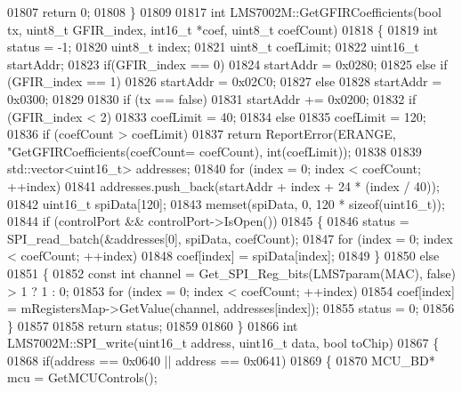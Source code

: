 \begin{DoxyCode}
{{{{{{{{{{{{{{{{{{{{{{{{{{{{{{{{{{{{{{{{{{{{{{{{{{{{{{01807     \textcolor{keywordflow}{return} 0;
01808 \}
01809 
01817 \textcolor{keywordtype}{int} LMS7002M::GetGFIRCoefficients(\textcolor{keywordtype}{bool} tx, uint8\_t GFIR\_index, int16\_t *coef, uint8\_t coefCount)
01818 \{
01819     \textcolor{keywordtype}{int} status = -1;
01820     uint8\_t index;
01821     uint8\_t coefLimit;
01822     uint16\_t startAddr;
01823     \textcolor{keywordflow}{if}(GFIR\_index == 0)
01824         startAddr = 0x0280;
01825     \textcolor{keywordflow}{else} \textcolor{keywordflow}{if} (GFIR\_index == 1)
01826         startAddr = 0x02C0;
01827     \textcolor{keywordflow}{else}
01828         startAddr = 0x0300;
01829 
01830     \textcolor{keywordflow}{if} (tx == \textcolor{keyword}{false})
01831         startAddr += 0x0200;
01832     \textcolor{keywordflow}{if} (GFIR\_index < 2)
01833         coefLimit = 40;
01834     \textcolor{keywordflow}{else}
01835         coefLimit = 120;
01836     \textcolor{keywordflow}{if} (coefCount > coefLimit)
01837         \textcolor{keywordflow}{return} ReportError(ERANGE, \textcolor{stringliteral}{"GetGFIRCoefficients(coefCount=%
      coefCount), \textcolor{keywordtype}{int}(coefLimit));
01838 
01839     std::vector<uint16\_t> addresses;
01840     \textcolor{keywordflow}{for} (index = 0; index < coefCount; ++index)
01841         addresses.push\_back(startAddr + index + 24 * (index / 40));
01842     uint16\_t spiData[120];
01843     memset(spiData, 0, 120 * \textcolor{keyword}{sizeof}(uint16\_t));
01844     \textcolor{keywordflow}{if} (controlPort && controlPort->IsOpen())
01845     \{
01846         status = SPI_read_batch(&addresses[0], spiData, coefCount);
01847         \textcolor{keywordflow}{for} (index = 0; index < coefCount; ++index)
01848             coef[index] = spiData[index];
01849     \}
01850     \textcolor{keywordflow}{else}
01851     \{
01852         \textcolor{keyword}{const} \textcolor{keywordtype}{int} channel = Get_SPI_Reg_bits(LMS7param(MAC), \textcolor{keyword}{false}) > 1 ? 1 : 0;
01853         \textcolor{keywordflow}{for} (index = 0; index < coefCount; ++index)
01854             coef[index] = mRegistersMap->GetValue(channel, addresses[index]);
01855         status = 0;
01856     \}
01857 
01858     \textcolor{keywordflow}{return} status;
01859 
01860 \}
01866 \textcolor{keywordtype}{int} LMS7002M::SPI_write(uint16\_t address, uint16\_t data, \textcolor{keywordtype}{bool} toChip)
01867 \{
01868     \textcolor{keywordflow}{if}(address == 0x0640 || address == 0x0641)
01869     \{
01870         MCU_BD* mcu = GetMCUControls();
}}}}}}}}}}}}}}}}}}}}}}}}}}}}}}}}}}}}}}}}}}}}}}}}}}}}}}}
\end{DoxyCode}
